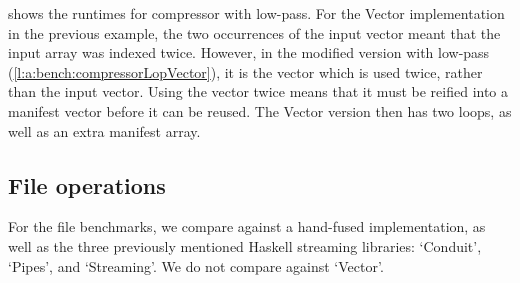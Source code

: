  shows the runtimes for compressor with low-pass.
For the Vector implementation in the previous example, the two occurrences of the input vector meant that the input array was indexed twice.
However, in the modified version with low-pass (\cref{l:a:bench:compressorLopVector}), it is the \Hs@lopass@ vector which is used twice, rather than the input vector.
Using the \Hs@lopass@ vector twice means that it must be reified into a manifest vector before it can be reused.
The Vector version then has two loops, as well as an extra manifest array.





\subsection{File operations}
For the file benchmarks, we compare against a hand-fused implementation, as well as the three previously mentioned Haskell streaming libraries: `Conduit', `Pipes', and `Streaming'.
We do not compare against `Vector'.

